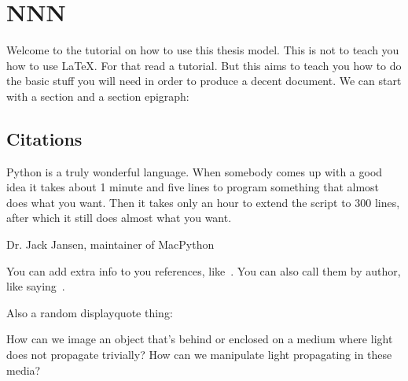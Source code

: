 
\chapter{NNN}


\label{ChapterTemplate}


Welcome to the tutorial on how to use this thesis model. This is not to teach
you how to use \LaTeX. For that read a tutorial. But this aims to teach you how
to do the basic stuff you will need in order to produce a decent document.
We can start with a section and a section epigraph:

\section{Citations}
\epigraph{Python is a truly wonderful language. When somebody comes up with a good idea it takes about 1 minute and five lines to program something that almost does what you want. Then it takes only an hour to extend the script to 300 lines, after which it still does almost what you want.}{Dr. Jack Jansen,  maintainer of MacPython}

You can add extra info to you references, like~\cite[section 3]{Fienup1982}. You
can also call them by author, like saying~\citet{Fienup1982}.

Also a random displayquote thing:

\begin{displayquote}
    How can we image an object that's behind or enclosed on a medium where light does not propagate trivially? How can we manipulate light propagating in these media?
\end{displayquote}

